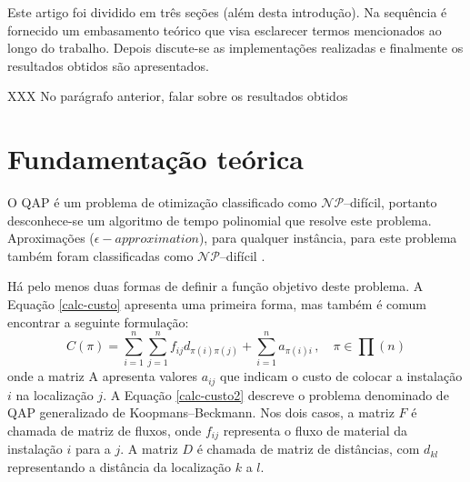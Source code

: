 Este artigo foi dividido em três seções (além desta introdução). Na
sequência é fornecido um embasamento teórico que visa esclarecer
termos mencionados ao longo do trabalho. Depois discute-se as
implementações realizadas e finalmente os resultados obtidos são
apresentados.

XXX No parágrafo anterior, falar sobre os resultados obtidos


\section{Fundamentação teórica}
\label{sec:fund}

O QAP é um problema de otimização classificado como
$\mathcal{NP}$--difícil,
portanto desconhece-se um algoritmo de tempo polinomial que resolve
este problema. Aproximações ($\epsilon-approximation$), para qualquer
instância, para este problema também foram classificadas como
$\mathcal{NP}$--difícil \cite{sahni-gonzales}.

Há pelo menos duas formas de definir a função objetivo deste problema.
A Equação \ref{calc-custo} apresenta uma primeira forma,
mas também é comum encontrar a seguinte formulação:
\begin{equation}\label{calc-custo2}
C(\pi) = \sum_{i = 1}^{n} \sum_{j = 1}^{n} f_{ij} d_{\pi(i)
   \pi(j)} + \sum_{i = 1}^{n} a_{\pi(i) i} \, , \quad \pi \in \prod(n)
\end{equation}
onde a matriz A apresenta valores $a_{ij}$ que indicam o custo de
colocar a instalação $i$ na localização $j$. A Equação
\ref{calc-custo2} descreve o problema denominado de QAP generalizado
de Koopmans--Beckmann. %
Nos dois casos, a matriz $F$ é chamada de matriz de fluxos, onde
$f_{ij}$ representa o
fluxo de material da instalação $i$ para a $j$. A matriz $D$ é chamada
de matriz de distâncias, com $d_{kl}$ representando a distância da
localização $k$ a $l$.%


